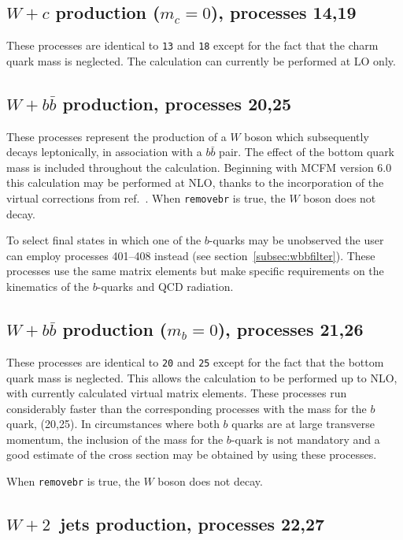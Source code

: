 \documentclass[12pt]{article}
\begin{document}
\subsection{$W+c$ production ($m_c=0$), processes 14,19}
\label{subsec:wcmassless}

These processes are identical to {\tt 13} and {\tt 18} except for the fact
that the charm quark mass is neglected. The calculation can currently be
performed at LO only.

\subsection{$W+b{\bar b}$ production, processes 20,25}
\label{subsec:wbb}

These processes represent the production of a $W$ boson which subsequently
decays leptonically, in association with a $b{\bar b}$ pair. The effect of
the bottom quark mass is included throughout the calculation.  
Beginning with MCFM version 6.0 this calculation may be performed at NLO, thanks to
the incorporation of the virtual corrections from ref.~\cite{Badger:2010mg}.
When {\tt removebr} is true, the $W$ boson does not decay.

To select final states in which one of the $b$-quarks may be unobserved the
user can employ processes 401--408 instead (see section~\ref{subsec:wbbfilter}).
These processes use the same matrix
elements but make specific requirements on the kinematics of the $b$-quarks
and QCD radiation. 

\subsection{$W+b{\bar b}$ production ($m_b=0$), processes 21,26}
\label{subsec:wbbmassless}

These processes are identical to {\tt 20} and {\tt 25} except for the fact
that the bottom quark mass is neglected. This allows the calculation to be
performed up to NLO, with currently calculated virtual matrix elements. These 
processes run considerably faster than the corresponding processes with the mass
for the $b$ quark, (20,25). In circumstances where both $b$ quarks are at large 
transverse momentum, the inclusion of the mass for the $b$-quark is not mandatory
and a good estimate of the cross section may be obtained by using these processes.

When {\tt removebr} is true, the $W$ boson does not decay.

\subsection{$W+2$~jets production, processes 22,27}
\label{subsec:w2jets}
\end{document}

